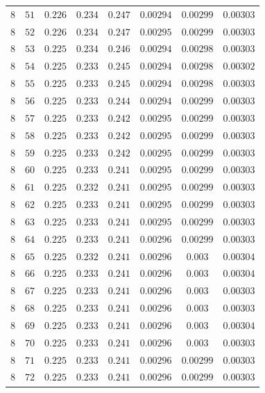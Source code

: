 \begin{table}[H]
\begin{tabular}{cccccccc}
$8$ & $51$ & $0.226$ & $0.234$ & $0.247$ & $0.00294$ & $0.00299$ & $0.00303$\\
$8$ & $52$ & $0.226$ & $0.234$ & $0.247$ & $0.00295$ & $0.00299$ & $0.00303$\\
$8$ & $53$ & $0.225$ & $0.234$ & $0.246$ & $0.00294$ & $0.00298$ & $0.00303$\\
$8$ & $54$ & $0.225$ & $0.233$ & $0.245$ & $0.00294$ & $0.00298$ & $0.00302$\\
$8$ & $55$ & $0.225$ & $0.233$ & $0.245$ & $0.00294$ & $0.00298$ & $0.00303$\\
$8$ & $56$ & $0.225$ & $0.233$ & $0.244$ & $0.00294$ & $0.00299$ & $0.00303$\\
$8$ & $57$ & $0.225$ & $0.233$ & $0.242$ & $0.00295$ & $0.00299$ & $0.00303$\\
$8$ & $58$ & $0.225$ & $0.233$ & $0.242$ & $0.00295$ & $0.00299$ & $0.00303$\\
$8$ & $59$ & $0.225$ & $0.233$ & $0.242$ & $0.00295$ & $0.00299$ & $0.00303$\\
$8$ & $60$ & $0.225$ & $0.233$ & $0.241$ & $0.00295$ & $0.00299$ & $0.00303$\\
$8$ & $61$ & $0.225$ & $0.232$ & $0.241$ & $0.00295$ & $0.00299$ & $0.00303$\\
$8$ & $62$ & $0.225$ & $0.233$ & $0.241$ & $0.00295$ & $0.00299$ & $0.00303$\\
$8$ & $63$ & $0.225$ & $0.233$ & $0.241$ & $0.00295$ & $0.00299$ & $0.00303$\\
$8$ & $64$ & $0.225$ & $0.233$ & $0.241$ & $0.00296$ & $0.00299$ & $0.00303$\\
$8$ & $65$ & $0.225$ & $0.232$ & $0.241$ & $0.00296$ & $0.003$ & $0.00304$\\
$8$ & $66$ & $0.225$ & $0.233$ & $0.241$ & $0.00296$ & $0.003$ & $0.00304$\\
$8$ & $67$ & $0.225$ & $0.233$ & $0.241$ & $0.00296$ & $0.003$ & $0.00303$\\
$8$ & $68$ & $0.225$ & $0.233$ & $0.241$ & $0.00296$ & $0.003$ & $0.00303$\\
$8$ & $69$ & $0.225$ & $0.233$ & $0.241$ & $0.00296$ & $0.003$ & $0.00304$\\
$8$ & $70$ & $0.225$ & $0.233$ & $0.241$ & $0.00296$ & $0.003$ & $0.00303$\\
$8$ & $71$ & $0.225$ & $0.233$ & $0.241$ & $0.00296$ & $0.00299$ & $0.00303$\\
$8$ & $72$ & $0.225$ & $0.233$ & $0.241$ & $0.00296$ & $0.00299$ & $0.00303$\\

\end{tabular}
\end{table}
